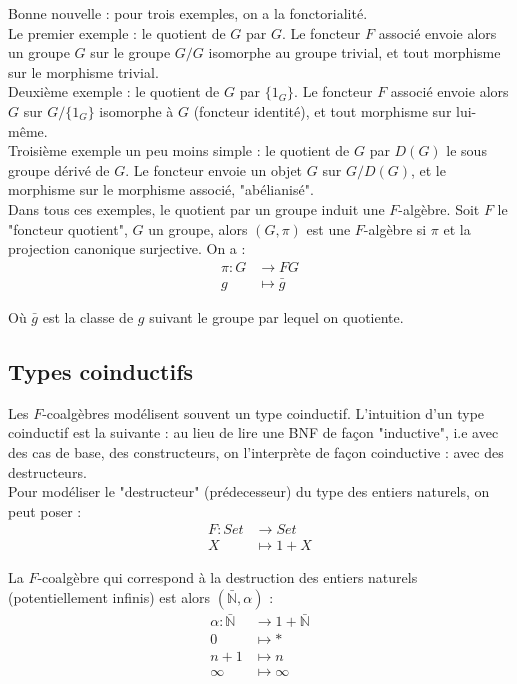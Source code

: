 \documentclass{article}
\newcommand{\N}{\mathbb{N}}
\begin{document}
Bonne nouvelle : pour trois exemples, on a la fonctorialité. \\ 
Le premier exemple : le quotient de $G$ par $G$. Le foncteur $F$ associé envoie alors un groupe $G$ sur le groupe $G/G$ isomorphe au groupe trivial, et tout morphisme sur le morphisme trivial. \\ 
Deuxième exemple : le quotient de $G$ par $\{1_G\}$. Le foncteur $F$ associé envoie alors $G$ sur $G/\{ 1_G\}$ isomorphe à $G$ (foncteur identité), et tout morphisme sur lui-même. \\ 
Troisième exemple un peu moins simple : le quotient de $G$ par $D(G)$ le sous groupe dérivé de $G$. Le foncteur envoie un objet $G$ sur $G/D(G)$, et le morphisme sur le morphisme associé, "abélianisé". \\ 
Dans tous ces exemples, le quotient par un groupe induit une $F$-algèbre. Soit $F$ le "foncteur quotient", $G$ un groupe, alors $(G, \pi)$ est une $F$-algèbre  si $\pi$ et la projection canonique surjective. On a :  
\begin{align*}
    \pi : G & \rightarrow  FG\\
          g & \mapsto \bar{g}
\end{align*}

Où $\bar{g}$ est la classe de $g$ suivant le groupe par lequel on quotiente. 

\subsection{Types coinductifs}
Les $F$-coalgèbres  modélisent  souvent un type coinductif. L'intuition d'un type coinductif est la suivante : au lieu de lire une BNF de façon "inductive", i.e avec des cas de base, des constructeurs, on l'interprète de façon coinductive : avec des destructeurs.  \\

Pour modéliser le "destructeur" (prédecesseur) du type des entiers naturels, on peut poser : 
\begin{align*}
    F : Set & \rightarrow Set \\ 
        X & \mapsto 1 + X
\end{align*}

La $F$-coalgèbre qui correspond à la destruction des entiers naturels (potentiellement infinis) est alors $(\bar{\N}, \alpha)$ : 
\begin{align*}
    \alpha : \bar{\N} &\rightarrow 1 + \bar{\N} \\ 
            0 &\mapsto * \\ 
            n+1 & \mapsto n \\
            \infty & \mapsto \infty
\end{align*}
\end{document}
